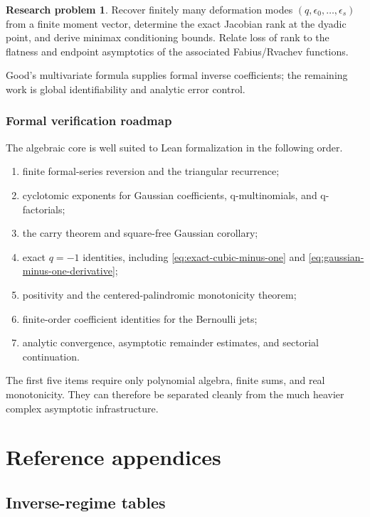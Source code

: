 \documentclass[11pt,letterpaper,oneside,openany]{book}
\theoremstyle{definition}
\newtheorem{researchproblem}{Research problem}[chapter]
\theoremstyle{remark}
\begin{document}
\begin{researchproblem}
Recover finitely many deformation modes \((q,\epsilon_0,\ldots,\epsilon_s)\)
from a finite moment vector, determine the exact Jacobian rank at the dyadic
point, and derive minimax conditioning bounds.  Relate loss of rank to the
flatness and endpoint asymptotics of the associated Fabius/Rvachev functions.
\end{researchproblem}

Good's multivariate formula supplies formal inverse coefficients; the remaining
work is global identifiability and analytic error control.

\section{Formal verification roadmap}
The algebraic core is well suited to Lean formalization in the following order.
\begin{enumerate}
\item finite formal-series reversion and the triangular recurrence;
\item cyclotomic exponents for Gaussian coefficients, q-multinomials, and
q-factorials;
\item the carry theorem and square-free Gaussian corollary;
\item exact \(q=-1\) identities, including \cref{eq:exact-cubic-minus-one} and
\cref{eq:gaussian-minus-one-derivative};
\item positivity and the centered-palindromic monotonicity theorem;
\item finite-order coefficient identities for the Bernoulli jets;
\item analytic convergence, asymptotic remainder estimates, and sectorial
continuation.
\end{enumerate}
The first five items require only polynomial algebra, finite sums, and real
monotonicity.  They can therefore be separated cleanly from the much heavier
complex asymptotic infrastructure.

\part{Reference appendices}

\chapter{Inverse-regime tables}
\end{document}

